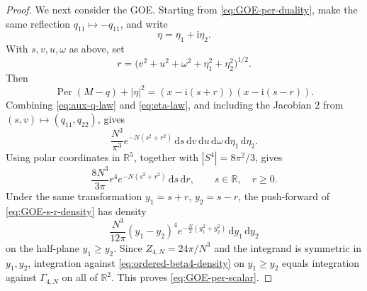\documentclass[10pt,a4paper]{amsart}
\DeclareMathOperator{\Per}{Per}
\newcommand{\R}{\mathbb R}
\newcommand{\dd}{\mathrm d}
\newcommand{\ii}{\mathrm i}
\begin{document}
\begin{proof}
We next consider the GOE.  Starting from \eqref{eq:GOE-per-duality}, make
the same reflection \(q_{11}\mapsto-q_{11}\), and write
\[
  \eta=\eta_1+\ii\eta_2.
\]
With \(s,v,u,\omega\) as above, set
\[
  r=
  \bigl(v^2+u^2+\omega^2+\eta_1^2+\eta_2^2\bigr)^{1/2}.
\]
Then
\[
  \Per(M-q)+|\eta|^2
  =
  (x-\ii(s+r))(x-\ii(s-r)).
\]
Combining \eqref{eq:aux-q-law} and \eqref{eq:eta-law}, and including the
Jacobian \(2\) from \((s,v)\mapsto(q_{11},q_{22})\), gives
\[
  \frac{N^3}{\pi^3}e^{-N(s^2+r^2)}
  \,\dd s\,\dd v\,\dd u\,\dd\omega\,\dd\eta_1\,\dd\eta_2.
\]
Using polar coordinates in \(\R^5\), together with
\(|S^4|=8\pi^2/3\), gives
\begin{equation}\label{eq:GOE-s-r-density}
  \frac{8N^3}{3\pi}r^4e^{-N(s^2+r^2)}\,\dd s\,\dd r,
  \qquad s\in\R,\quad r\ge0.
\end{equation}
Under the same transformation \(y_1=s+r\), \(y_2=s-r\), the push-forward
of \eqref{eq:GOE-s-r-density} has density
\begin{equation}\label{eq:ordered-beta4-density}
  \frac{N^3}{12\pi}(y_1-y_2)^4
  e^{-\frac N2(y_1^2+y_2^2)}\,\dd y_1\,\dd y_2
\end{equation}
on the half-plane \(y_1\ge y_2\).  Since \(Z_{4,N}=24\pi/N^3\) and the
integrand is symmetric in \(y_1,y_2\), integration against
\eqref{eq:ordered-beta4-density} on \(y_1\ge y_2\) equals integration
against \(\Gamma_{4,N}\) on all of \(\R^2\).  This proves
\eqref{eq:GOE-per-scalar}.

 
\end{proof}
\end{document}
